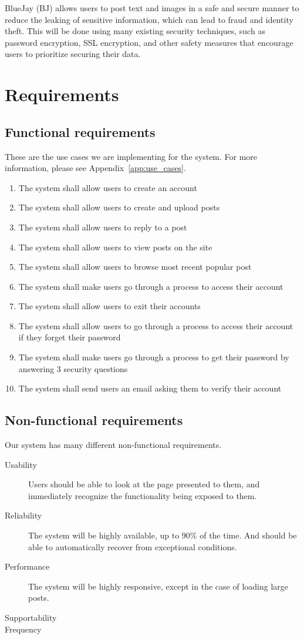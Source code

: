 \documentclass{report}
\begin{document}
	BlueJay (BJ) allows users to post text and images in a safe and secure manner to reduce the leaking of sensitive information,
	which can lead to fraud and identity theft.
	This will be done using many existing security techniques, such as password encryption, SSL encryption,
	and other safety measures that encourage users to prioritize securing their data.
\section{Requirements}
	\subsection{Functional requirements}
	These are the use cases we are implementing for the system.
	For more information, please see Appendix~\ref{app:use_cases}.
	\begin{enumerate}
		\item The system shall allow users to create an account
		\item The system shall allow users to create and upload posts
		\item The system shall allow users to reply to a post
		\item The system shall allow users to view posts on the site
		\item The system shall allow users to browse most recent popular post
		\item The system shall make users go through a process to access their account
		\item The system shall allow users to exit their accounts
		\item The system shall allow users to go through a process to access their account if they forget their password
		\item The system shall make users go through a process to get their password by answering 3 security questions
		\item The system shall send users an email asking them to verify their account
	\end{enumerate}
	\subsection{Non-functional requirements}
	Our system has many different non-functional requirements.
	\begin{description}
		\item [Usability] Users should be able to look at the page presented to them,
		and immediately recognize the functionality being exposed to them.
		\item [Reliability] The system will be highly available, up to 90\% of the time.
		And should be able to automatically recover from exceptional conditions.
		\item [Performance] The system will be highly responsive,
		except in the case of loading large posts.
		\item [Supportability]
		\item [Frequency]
	\end{description}
\end{document}
